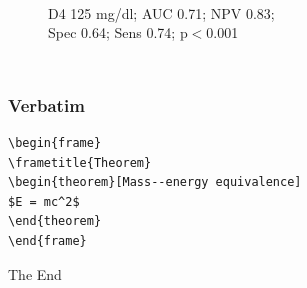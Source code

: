 \documentclass[10pt]{beamer}
\begin{document}
\begin{frame}
\begin{columns}
\begin{figure}
				\\{\scriptsize D4 125 mg/dl; AUC 0.71; NPV 0.83; \\Spec 0.64; Sens 0.74; p$<$0.001}
			\end{figure}
	\end{columns}
\end{frame}








\begin{frame}[fragile] %
\frametitle{Verbatim}
\begin{example}
\begin{verbatim}
\begin{frame}
\frametitle{Theorem}
\begin{theorem}[Mass--energy equivalence]
$E = mc^2$
\end{theorem}
\end{frame}\end{verbatim}
\end{example}
\end{frame}



\begin{frame}
\Huge{\centerline{The End}}
\end{frame}

\end{document}
